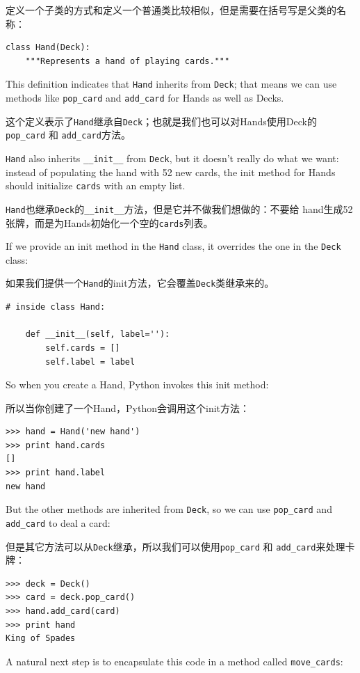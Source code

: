 \documentclass[10pt]{book}
\begin{document}
\begin{CJK}{UTF8}{gbsn}
定义一个子类的方式和定义一个普通类比较相似，但是需要在括号写是父类的名称：

\begin{verbatim}
class Hand(Deck):
    """Represents a hand of playing cards."""
\end{verbatim}
%
This definition indicates that {\tt Hand} inherits from {\tt Deck};
that means we can use methods like \verb"pop_card" and \verb"add_card"
for Hands as well as Decks.

这个定义表示了{\tt Hand}继承自{\tt Deck}；也就是我们也可以对Hands使用Deck的
\verb"pop_card" 和 \verb"add_card"方法。

{\tt Hand} also inherits \verb"__init__" from {\tt Deck}, but
it doesn't really do what we want: instead of populating the hand
with 52 new cards, the init method for Hands should initialize
{\tt cards} with an empty list.

{\tt Hand}也继承{\tt Deck}的\verb"__init__"方法，但是它并不做我们想做的：不要给
hand生成52张牌，而是为Hands初始化一个空的{\tt cards}列表。

If we provide an init method in the {\tt Hand} class, it overrides the
one in the {\tt Deck} class:

如果我们提供一个{\tt Hand}的init方法，它会覆盖{\tt Deck}类继承来的。

\begin{verbatim}
# inside class Hand:

    def __init__(self, label=''):
        self.cards = []
        self.label = label
\end{verbatim}
%
So when you create a Hand, Python invokes this init method:

所以当你创建了一个Hand，Python会调用这个init方法：

\begin{verbatim}
>>> hand = Hand('new hand')
>>> print hand.cards
[]
>>> print hand.label
new hand
\end{verbatim}
%
But the other methods are inherited from {\tt Deck}, so we can use
\verb"pop_card" and \verb"add_card" to deal a card:

但是其它方法可以从{\tt Deck}继承，所以我们可以使用\verb"pop_card" 和
\verb"add_card"来处理卡牌：

\begin{verbatim}
>>> deck = Deck()
>>> card = deck.pop_card()
>>> hand.add_card(card)
>>> print hand
King of Spades
\end{verbatim}
%
A natural next step is to encapsulate this code in a method
called \verb"move_cards":


\end{CJK}
\end{document}
